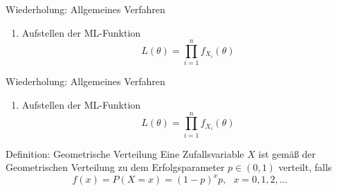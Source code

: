 \documentclass[t,11pt]{beamer}
\begin{document}
\begin{frame}
\end{frame}

\begin{frame}
\end{frame}

\begin{frame}
\end{frame}

\begin{frame}
	\begin{exampleblock}{Wiederholung: Allgemeines Verfahren}
		\begin{enumerate}
			\item Aufstellen der ML-Funktion $$L(\theta)=\prod_{i=1}^{n}f_{X_i}(\theta)$$
		\end{enumerate}
	\end{exampleblock}
\end{frame}

\begin{frame}
\begin{exampleblock}{Wiederholung: Allgemeines Verfahren}
	\begin{enumerate}
		\item Aufstellen der ML-Funktion $$L(\theta)=\prod_{i=1}^{n}f_{X_i}(\theta)$$
	\end{enumerate}
\end{exampleblock}
\begin{alertblock}{Definition: Geometrische Verteilung}
	Eine Zufallsvariable $X$ ist gemäß der Geometrischen Verteilung zu dem Erfolgsparameter $p\in (0,1)$ verteilt, falls
	\begin{equation*}
	f(x)=P(X=x)=(1-p)^xp, \ \ \ x=0,1,2,\dots
	\end{equation*}
\end{alertblock}
\end{frame}
\end{document}
